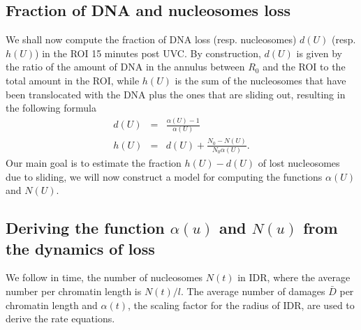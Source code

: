 \documentclass[12pt]{article}
\begin{document}
\subsection{Fraction of DNA and nucleosomes loss }\label{subsection:fractionOfDNAandNucleosomeLoss}
We shall now compute the fraction of DNA loss (resp. nucleosomes) $d(U)$ (resp. $h(U)$) in the ROI 15 minutes post UVC. By construction, $d(U)$ is given by the ratio of the amount of DNA in the annulus between $R_0$ and the ROI to the total amount in the ROI, while $h(U)$ is the sum of the nucleosomes that have been translocated with the DNA plus the ones that are sliding out, resulting in the following formula
\begin{eqnarray*}
d(U)&=& \frac{\alpha(U) -1}{\alpha(U)} \\
h(U)&=&d(U)+\frac{N_0-N(U)}{N_0 \alpha(U)}.
\end{eqnarray*}
Our main goal is to estimate the fraction $h(U)-d(U)$ of lost nucleosomes due to sliding, we will now construct a model for computing the functions $\alpha(U)$ and $N(U)$.
\subsection{Deriving the function $\alpha(u)$ and $N(u)$ from the dynamics of loss}
We follow in time, the number of nucleosomes $N(t)$ in IDR, where the average number per chromatin length is $N(t)/l$. The average number of damages $\bar{D}$ per chromatin length and $\alpha(t)$, the scaling factor for the radius of IDR, are used to derive the rate equations.
\end{document}
